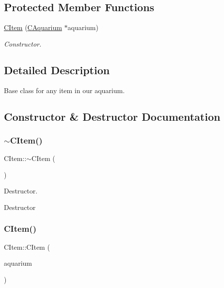 \subsection*{Protected Member Functions}
\begin{DoxyCompactItemize}
\item 
\hyperlink{class_c_item_a665b3fa4628b43e69b1d7f2b9529882b}{C\+Item} (\hyperlink{class_c_aquarium}{C\+Aquarium} $\ast$aquarium)
\begin{DoxyCompactList}\small\item\em Constructor. \end{DoxyCompactList}\end{DoxyCompactItemize}


\subsection{Detailed Description}
Base class for any item in our aquarium. 

\subsection{Constructor \& Destructor Documentation}
\mbox{\label{class_c_item_a2487c6e822ed0e850544f1745b43f584}} 
\subsubsection{\texorpdfstring{$\sim$\+C\+Item()}{~CItem()}}
{\footnotesize\ttfamily C\+Item\+::$\sim$\+C\+Item (\begin{DoxyParamCaption}{ }\end{DoxyParamCaption})\hspace{0.3cm}{\ttfamily [virtual]}}



Destructor. 

Destructor \mbox{\label{class_c_item_a665b3fa4628b43e69b1d7f2b9529882b}} 
\subsubsection{\texorpdfstring{C\+Item()}{CItem()}}
{\footnotesize\ttfamily C\+Item\+::\+C\+Item (\begin{DoxyParamCaption}\item[{\hyperlink{class_c_aquarium}{C\+Aquarium} $\ast$}]{aquarium }\end{DoxyParamCaption})\hspace{0.3cm}{\ttfamily [protected]}}



